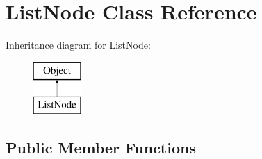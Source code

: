 \hypertarget{class_list_node}{}\section{List\+Node Class Reference}
\label{class_list_node}
Inheritance diagram for List\+Node\+:\begin{figure}[H]
\begin{center}
\leavevmode
\includegraphics[height=2.000000cm]{class_list_node}
\end{center}
\end{figure}
\subsection*{Public Member Functions}
